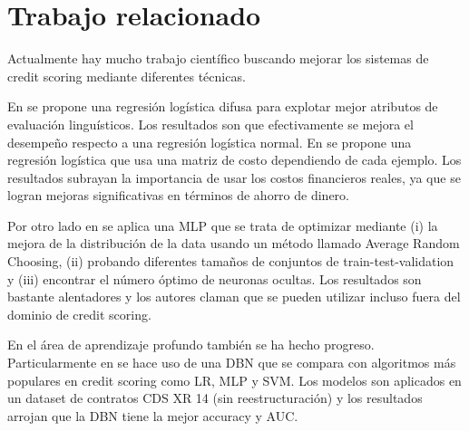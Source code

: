 
\section{Trabajo relacionado}

Actualmente hay mucho trabajo científico buscando mejorar los sistemas de credit scoring mediante diferentes técnicas.

En \cite{sohn2016technology} se propone una regresión logística difusa para explotar mejor atributos de evaluación linguísticos. Los resultados son que efectivamente se mejora el desempeño respecto a una regresión logística normal. En \cite{bahnsen2014example} se propone una regresión logística que usa una matriz de costo dependiendo de cada ejemplo. Los resultados subrayan la importancia de usar los costos financieros reales, ya que se logran mejoras significativas en términos de ahorro de dinero.

Por otro lado en \cite{zhao2015investigation} se aplica una \ac{MLP} que se trata de optimizar mediante (i) la mejora de la distribución de la data usando un método llamado Average Random Choosing, (ii) probando diferentes tamaños de conjuntos de train-test-validation y (iii) encontrar el número óptimo de neuronas ocultas. Los resultados son bastante alentadores y los autores claman que se pueden utilizar incluso fuera del dominio de credit scoring.

En el área de aprendizaje profundo también se ha hecho progreso. Particularmente en \cite{luo2017deep} se hace uso de una \ac{DBN} que se compara con algoritmos más populares en credit scoring como \ac{LR}, \ac{MLP} y \ac{SVM}. Los modelos son aplicados en un dataset de contratos CDS XR 14 (sin reestructuración) y los resultados arrojan que la \ac{DBN} tiene la mejor accuracy y AUC.

